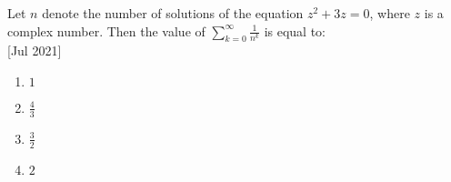     \item{
        
            Let $n$ denote the number of solutions of the equation $z^2 + 3z = 0$, where $z$ is a complex number. Then the value of $\sum_{k=0}^{\infty} \frac{1}{n^k}$ is equal to:\\ \text{ }
             \hfill
              {[Jul 2021]}
			\begin{multicols}{4}              
	              	\begin{enumerate}
	              		\item $1$
	              		\item $\frac{4}{3}$
	              		\item $\frac{3}{2}$
	              		\item $2$
	              	\end{enumerate}
  			\end{multicols}      
        }



